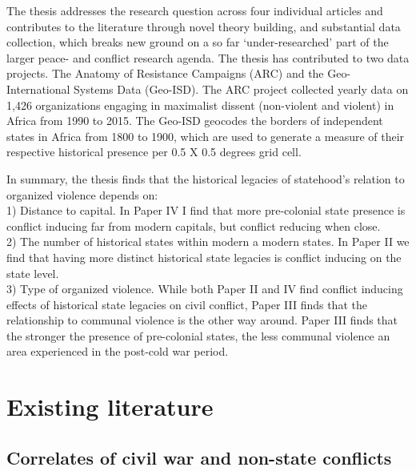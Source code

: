 The thesis addresses the research question across four individual articles and
contributes to the literature through novel theory building, and substantial data
collection, which breaks new ground on a so far `under-researched' part of the
larger peace- and conflict research agenda. The thesis has contributed to two data
projects. The Anatomy of Resistance Campaigns (ARC) and the Geo-International
Systems Data (Geo-ISD). The ARC project collected yearly data on 1,426
organizations engaging in maximalist dissent (non-violent and violent) in Africa
from 1990 to 2015. The Geo-ISD geocodes the borders of independent states in
Africa from 1800 to 1900, which are used to generate a measure of their
respective historical presence per 0.5 X 0.5 degrees grid cell. 

In summary, the thesis finds that the historical legacies of statehood's
relation to organized violence depends on:\\

1) Distance to capital. In Paper IV I find that more pre-colonial state presence
is conflict inducing far from modern capitals, but conflict reducing when
close.\\

2) The number of historical states within modern a modern states. In Paper II we
find that having more distinct historical state legacies is conflict inducing on
the state level.\\

3) Type of organized violence. While both Paper II and IV find conflict inducing
effects of historical state legacies on civil conflict, Paper III finds that the
relationship to communal violence is the other way around. Paper III finds that
the stronger the presence of pre-colonial states, the less communal violence an
area experienced in the post-cold war period.

\section{Existing literature} \label{Existing literature}

\subsection{Correlates of civil war and non-state conflicts} 
\label{Correlates of civil war and non-state conflicts}

